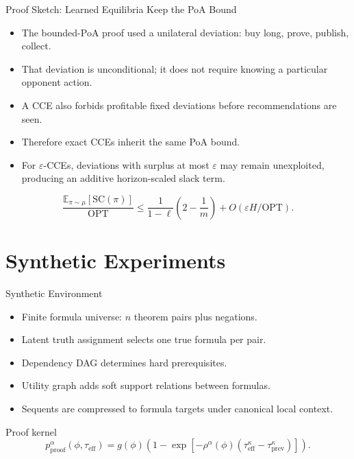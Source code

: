 \documentclass[10pt,aspectratio=169]{beamer}
\newcommand{\SC}{\mathrm{SC}}
\newcommand{\OPT}{\mathrm{OPT}}
\begin{document}
\begin{frame}{Proof Sketch: Learned Equilibria Keep the PoA Bound}
\small
\begin{itemize}
  \item The bounded-PoA proof used a unilateral deviation: buy long, prove, publish, collect.
  \item That deviation is unconditional; it does not require knowing a particular opponent action.
  \item A CCE also forbids profitable fixed deviations before recommendations are seen.
  \item Therefore exact CCEs inherit the same PoA bound.
  \item For $\varepsilon$-CCEs, deviations with surplus at most $\varepsilon$ may remain unexploited, producing an additive horizon-scaled slack term.
\end{itemize}
\[
\frac{\mathbb{E}_{\pi\sim\mu}[\SC(\pi)]}{\OPT}
\le
\frac{1}{1-\ell}\left(2-\frac1m\right)
+ O(\varepsilon H/\OPT).
\]
\end{frame}

\section{Synthetic Experiments}

\begin{frame}{Synthetic Environment}
\small
\begin{itemize}
  \item Finite formula universe: $n$ theorem pairs plus negations.
  \item Latent truth assignment selects one true formula per pair.
  \item Dependency DAG determines hard prerequisites.
  \item Utility graph adds soft support relations between formulas.
  \item Sequents are compressed to formula targets under canonical local context.
\end{itemize}

\begin{block}{Proof kernel}
\[
p^\alpha_{\mathrm{proof}}(\phi,\tau_{\mathrm{eff}})
=g(\phi)\left(1-\exp\left[-\rho^\alpha(\phi)(\tau_{\mathrm{eff}}^\kappa-\tau_{\mathrm{prev}}^\kappa)\right]\right).
\]
\end{block}
\end{frame}
\end{document}
